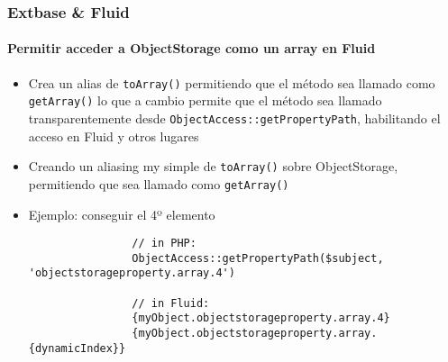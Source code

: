 \begin{frame}[fragile]
	\frametitle{Extbase \& Fluid}
	\framesubtitle{Permitir acceder a ObjectStorage como un array en Fluid}

	\lstset{basicstyle=\tiny\ttfamily}

	\begin{itemize}

		\item Crea un alias de \texttt{toArray()} permitiendo que el método sea
			llamado como \texttt{getArray()} lo que a cambio permite que el método sea
			llamado transparentemente desde \texttt{ObjectAccess::getPropertyPath},
			habilitando el acceso en Fluid y otros lugares

		\item Creando un aliasing my simple de \texttt{toArray()} sobre
			ObjectStorage, permitiendo que sea llamado como \texttt{getArray()}

		\item Ejemplo: conseguir el 4º elemento

			\begin{lstlisting}
				// in PHP:
				ObjectAccess::getPropertyPath($subject, 'objectstorageproperty.array.4')

				// in Fluid:
				{myObject.objectstorageproperty.array.4}
				{myObject.objectstorageproperty.array.{dynamicIndex}}
			\end{lstlisting}

	\end{itemize}
\end{frame}


